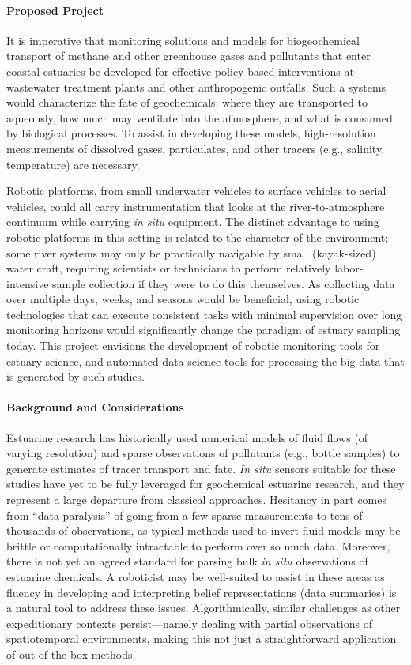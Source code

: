 \paragraph{Proposed Project}
It is imperative that monitoring solutions and models for biogeochemical transport of methane and other greenhouse gases and pollutants that enter coastal estuaries be developed for effective policy-based interventions at wastewater treatment plants and other anthropogenic outfalls. Such a systems would characterize the fate of geochemicals: where they are transported to aqueously, how much may ventilate into the atmosphere, and what is consumed by biological processes. To assist in developing these models, high-resolution measurements of dissolved gases, particulates, and other tracers (e.g., salinity, temperature) are necessary. 

Robotic platforms, from small underwater vehicles to surface vehicles to aerial vehicles, could all carry instrumentation that looks at the river-to-atmosphere continuum while carrying \emph{in situ} equipment. The distinct advantage to using robotic platforms in this setting is related to the character of the environment; some river systems may only be practically navigable by small (kayak-sized) water craft, requiring scientists or technicians to perform relatively labor-intensive sample collection if they were to do this themselves. As collecting data over multiple days, weeks, and seasons would be beneficial, using robotic technologies that can execute consistent tasks with minimal supervision over long monitoring horizons would significantly change the paradigm of estuary sampling today. This project envisions the development of robotic monitoring tools for estuary science, and automated data science tools for processing the big data that is generated by such studies.


\paragraph{Background and Considerations}
Estuarine research has historically used numerical models of fluid flows \autocite{geyer2014estuarine} (of varying resolution) and sparse observations of pollutants (e.g., bottle samples) \autocite{rheuban2019quantifying} to generate estimates of tracer transport and fate. \emph{In situ} sensors suitable for these studies have yet to be fully leveraged for geochemical estuarine research, and they represent a large departure from classical approaches. Hesitancy in part comes from ``data paralysis'' of going from a few sparse measurements to tens of thousands of observations, as typical methods used to invert fluid models may be brittle or computationally intractable to perform over so much data. Moreover, there is not yet an agreed standard for parsing bulk \emph{in situ} observations of estuarine chemicals. A roboticist may be well-suited to assist in these areas as fluency in developing and interpreting belief representations (data summaries) is a natural tool to address these issues. Algorithmically, similar challenges as other expeditionary contexts persist---namely dealing with partial observations of spatiotemporal environments, making this not just a straightforward application of out-of-the-box methods. 


